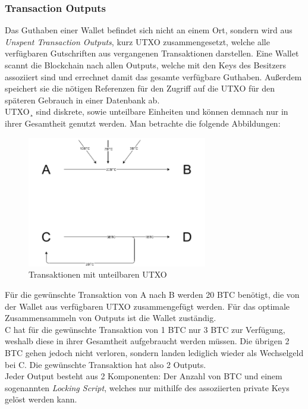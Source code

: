 \subsubsection{Transaction Outputs}
Das Guthaben einer Wallet befindet sich nicht an einem Ort, sondern wird aus \emph{Unspent Transaction Outputs}, kurz UTXO zusammengesetzt, welche alle verfügbaren Gutschriften aus vergangenen Transaktionen darstellen.
Eine Wallet scannt die Blockchain nach allen Outputs, welche mit den Keys des Besitzers assoziiert sind und errechnet damit das gesamte verfügbare Guthaben. Außerdem speichert sie die nötigen Referenzen für den Zugriff auf die UTXO für den späteren Gebrauch in einer Datenbank ab.\\
UTXO¸ sind diskrete, sowie unteilbare Einheiten und können demnach nur in ihrer Gesamtheit genutzt werden. Man betrachte die folgende Abbildungen:
\begin{figure}[htpb]
	\centering
	\includegraphics[width=0.7\textwidth]{images/UTXO.png}
	\caption{Transaktionen mit unteilbaren UTXO}
	\label{6braun:fig:Transaktionen}
\end{figure}
Für die gewünschte Transaktion von A nach B werden 20 BTC benötigt, die von der Wallet aus verfügbaren UTXO zusammengefügt werden. 
Für das optimale Zusammensammeln von Outputs ist die Wallet zuständig.\\
C hat für die gewünschte Transaktion von 1 BTC nur 3 BTC zur Verfügung, weshalb diese in ihrer Gesamtheit aufgebraucht werden müssen.
Die übrigen 2 BTC gehen jedoch nicht verloren, sondern landen lediglich wieder als Wechselgeld bei C. 
Die gewünschte Transaktion hat also 2 Outputs.\\
Jeder Output besteht aus 2 Komponenten: Der Anzahl von BTC und einem sogenannten \emph{Locking Script}, welches nur mithilfe des assoziierten private Keys gelöst werden kann. 
